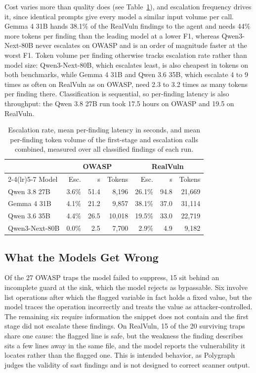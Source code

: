 Cost varies more than quality does (see Table~\ref{tab:cost}), and escalation
frequency drives it, since identical prompts give every model a similar input
volume per call. Gemma 4 31B hands 38.1\% of the RealVuln findings to the agent and
needs 44\% more tokens per finding than the leading model at a lower
F1, whereas Qwen3-Next-80B never escalates on OWASP and is an order of
magnitude faster at the worst F1. Token volume per finding otherwise tracks
escalation rate rather than model size: Qwen3-Next-80B, which escalates
least, is also cheapest in tokens on both benchmarks, while Gemma 4 31B and
Qwen 3.6 35B, which escalate 4 to 9 times as often on RealVuln as on OWASP,
need 2.3 to 3.2 times as many tokens per finding there. Classification is sequential, so per-finding
latency is also throughput: the Qwen 3.8 27B run took 17.5 hours on OWASP and
19.5 on RealVuln.

\begin{table}[t]
\caption{Escalation rate, mean per-finding latency in seconds, and mean
per-finding token volume of the first-stage and escalation calls combined,
measured over all classified findings of each run.}
\label{tab:cost}
\centering
\footnotesize
\begin{tabular}{lrrrrrr}
\toprule
& \multicolumn{3}{c}{OWASP} & \multicolumn{3}{c}{RealVuln} \\
\cmidrule(lr){2-4}\cmidrule(lr){5-7}
Model & Esc. & s & Tokens & Esc. & s & Tokens \\
\midrule
Qwen 3.8 27B    & 3.6\% & 51.4 & 8,196  & 26.1\% & 94.8 & 21,669 \\
Gemma 4 31B     & 4.1\% & 21.2 & 9,857  & 38.1\% & 37.0 & 31,114 \\
Qwen 3.6 35B    & 4.4\% & 26.5 & 10,018 & 19.5\% & 33.0 & 22,719 \\
Qwen3-Next-80B  & 0.0\% &  2.5 & 7,700  &  2.9\% &  4.9 &  9,182 \\
\bottomrule
\end{tabular}
\end{table}

\subsection{What the Models Get Wrong}
\label{sec:error-analysis}

Of the 27 OWASP traps the model failed to suppress, 15 sit behind an incomplete guard at the sink, which the model rejects as bypassable. Six involve list operations after which the flagged variable in fact holds a fixed value, but the model traces the operation incorrectly and treats the value as attacker-controlled. The remaining six require information the snippet does not contain and the first stage did not escalate these findings.
On RealVuln, 15 of the 20 surviving traps share one cause: the flagged line is
safe, but the weakness the finding describes sits a few lines away in the same
file, and the model reports the vulnerability it locates rather than the
flagged one. This is intended behavior, as Polygraph judges the validity of \ac{sast} findings and is not designed to correct scanner output.

